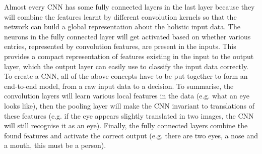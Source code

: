 \noindent
Almost every \gls{CNN} has some fully connected layers in the last layer because they will combine the features learnt by different convolution kernels so that the network can build a global representation about the holistic input data. The neurons in the fully connected layer will get activated based on whether various entries, represented by convolution features, are present in the inputs. This provides a compact representation of features existing in the input to the output layer, which the output layer can easily use to classify the input data correctly.
\newline
\newline
To create a \gls{CNN}, all of the above concepts have to be put together to form an end-to-end model, from a raw input data to a decision. To summarise, the convolution layers will learn various local features in the data (e.g. what an eye looks like), then the pooling layer will make the \gls{CNN} invariant to translations of these features (e.g. if the eye appears slightly translated in two images, the \gls{CNN} will still recognise it as an eye). Finally, the fully connected layers combine the found features and activate the correct output (e.g. there are two eyes, a nose and a mouth, this must be a person).

